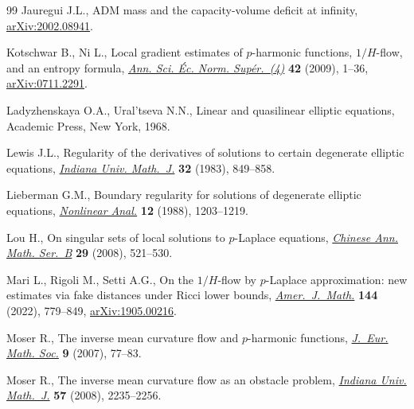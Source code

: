 \documentclass[11pt]{article}
\numberwithin{equation}{section}
\numberwithin{equation}{section}
\begin{document}
\begin{thebibliography}{99}
Jauregui J.L., {ADM} mass and the capacity-volume deficit at infinity,
 \href{https://arxiv.org/abs/2002.08941}{arXiv:2002.08941}.

Kotschwar B., Ni L., Local gradient estimates of {$p$}-harmonic functions,
 {$1/H$}-flow, and an entropy formula, \href{https://doi.org/10.24033/asens.2089}{\textit{Ann. Sci. \'Ec. Norm.
 Sup\'er.~(4)}} \textbf{42} (2009), 1--36, \href{https://arxiv.org/abs/0711.2291}{arXiv:0711.2291}.

Ladyzhenskaya O.A., Ural'tseva N.N., Linear and quasilinear elliptic equations,
 Academic Press, New York, 1968.

Lewis J.L., Regularity of the derivatives of solutions to certain degenerate
 elliptic equations, \href{https://doi.org/10.1512/iumj.1983.32.32058}{\textit{Indiana Univ. Math.~J.}} \textbf{32} (1983),
 849--858.

Lieberman G.M., Boundary regularity for solutions of degenerate elliptic
 equations, \href{https://doi.org/10.1016/0362-546X(88)90053-3}{\textit{Nonlinear Anal.}} \textbf{12} (1988), 1203--1219.

Lou H., On singular sets of local solutions to {$p$}-{L}aplace equations,
 \href{https://doi.org/10.1007/s11401-007-0312-y}{\textit{Chinese Ann. Math. Ser.~B}} \textbf{29} (2008), 521--530.

Mari L., Rigoli M., Setti A.G., On the {$1/H$}-flow by {$p$}-{L}aplace
 approximation: new estimates via fake distances under {R}icci lower bounds,
 \href{https://doi.org/10.1353/ajm.2022.0016}{\textit{Amer.~J.~Math.}} \textbf{144} (2022), 779--849, \href{https://arxiv.org/abs/1905.00216}{arXiv:1905.00216}.

Moser R., The inverse mean curvature flow and {$p$}-harmonic functions,
 \href{https://doi.org/10.4171/JEMS/73}{\textit{J.~Eur. Math. Soc.}} \textbf{9} (2007), 77--83.

Moser R., The inverse mean curvature flow as an obstacle problem,
 \href{https://doi.org/10.1512/iumj.2008.57.3385}{\textit{Indiana Univ. Math.~J.}} \textbf{57} (2008), 2235--2256.


\end{thebibliography}
\end{document}
